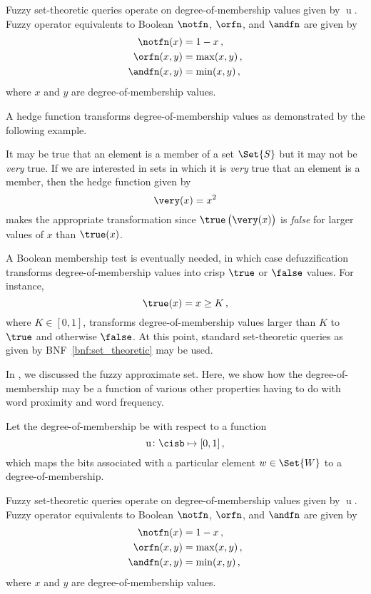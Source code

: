 \documentclass[ ../main.tex]{subfiles}
\begin{document}
Fuzzy set-theoretic queries operate on degree-of-membership values given by $\operatorname{u}$. Fuzzy operator equivalents to Boolean $\notfn$, $\orfn$, and $\andfn$ are given by
\begin{align}
    \notfn(x) &= 1 - x\,,\\
    \orfn(x, y) &= \max(x, y)\,,\\
    \andfn(x, y) &= \min(x, y)\,,
\end{align}
where $x$ and $y$ are degree-of-membership values.

A hedge function transforms degree-of-membership values as demonstrated by the following example.
\begin{example}
It may be true that an element is a member of a set $\Set{S}$ but it may not be \emph{very} true. If we are interested in sets in which it is \emph{very} true that an element is a member, then the hedge function given by
\begin{equation}
    \very(x) = x^2
\end{equation}
makes the appropriate transformation since $\true\left(\very(x)\right)$ is \emph{false} for larger values of $x$ than $\true(x)$.
\end{example}

A Boolean membership test is eventually needed, in which case defuzzification transforms degree-of-membership values into crisp $\true$ or $\false$ values. For instance,
\begin{equation}
    \true(x) = x \geq K\,,
\end{equation}
where $K \in [0,1]$, transforms degree-of-membership values larger than $K$ to $\true$ and otherwise $\false$. At this point, standard set-theoretic queries as given by BNF~\ref{bnf:set_theoretic} may be used.



In \cite{}, we discussed the fuzzy approximate set. Here, we show how the degree-of-membership may be a function of various other properties having to do with word proximity and word frequency.

Let the degree-of-membership be with respect to a function
\begin{equation}
    \operatorname{u} \colon \cisb \mapsto [0,1]\,,
\end{equation}
which maps the bits associated with a particular element $w \in \Set{W}$ to a degree-of-membership.

Fuzzy set-theoretic queries operate on degree-of-membership values given by $\operatorname{u}$. Fuzzy operator equivalents to Boolean $\notfn$, $\orfn$, and $\andfn$ are given by
\begin{align}
    \notfn(x) &= 1 - x\,,\\
    \orfn(x, y) &= \max(x, y)\,,\\
    \andfn(x, y) &= \min(x, y)\,,
\end{align}
where $x$ and $y$ are degree-of-membership values.
\end{document}
